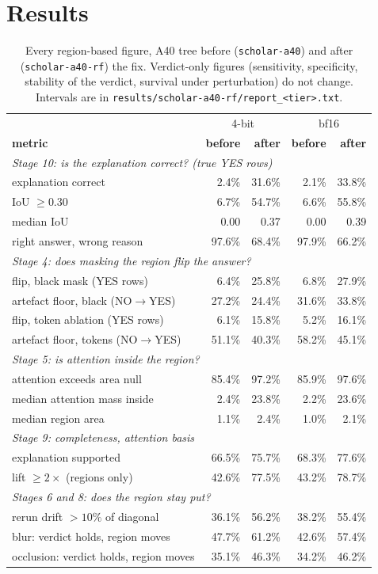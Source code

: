 \section{Results}

\begin{table}[tbp]
\centering
\small
\begin{tabular}{p{6.0cm}rrrr}
\toprule
 & \multicolumn{2}{c}{4-bit} & \multicolumn{2}{c}{bf16} \\
\textbf{metric} & \textbf{before} & \textbf{after} & \textbf{before} & \textbf{after} \\
\midrule
\multicolumn{5}{l}{\emph{Stage 10: is the explanation correct? (true YES rows)}} \\
explanation correct & 2.4\% & 31.6\% & 2.1\% & 33.8\% \\
IoU $\geq 0.30$ & 6.7\% & 54.7\% & 6.6\% & 55.8\% \\
median IoU & 0.00 & 0.37 & 0.00 & 0.39 \\
right answer, wrong reason & 97.6\% & 68.4\% & 97.9\% & 66.2\% \\
\multicolumn{5}{l}{\emph{Stage 4: does masking the region flip the answer?}} \\
flip, black mask (YES rows) & 6.4\% & 25.8\% & 6.8\% & 27.9\% \\
artefact floor, black (NO$\to$YES) & 27.2\% & 24.4\% & 31.6\% & 33.8\% \\
flip, token ablation (YES rows) & 6.1\% & 15.8\% & 5.2\% & 16.1\% \\
artefact floor, tokens (NO$\to$YES) & 51.1\% & 40.3\% & 58.2\% & 45.1\% \\
\multicolumn{5}{l}{\emph{Stage 5: is attention inside the region?}} \\
attention exceeds area null & 85.4\% & 97.2\% & 85.9\% & 97.6\% \\
median attention mass inside & 2.4\% & 23.8\% & 2.2\% & 23.6\% \\
median region area & 1.1\% & 2.4\% & 1.0\% & 2.1\% \\
\multicolumn{5}{l}{\emph{Stage 9: completeness, attention basis}} \\
explanation supported & 66.5\% & 75.7\% & 68.3\% & 77.6\% \\
lift $\geq 2\times$ (regions only) & 42.6\% & 77.5\% & 43.2\% & 78.7\% \\
\multicolumn{5}{l}{\emph{Stages 6 and 8: does the region stay put?}} \\
rerun drift $>10\%$ of diagonal & 36.1\% & 56.2\% & 38.2\% & 55.4\% \\
blur: verdict holds, region moves & 47.7\% & 61.2\% & 42.6\% & 57.4\% \\
occlusion: verdict holds, region moves & 35.1\% & 46.3\% & 34.2\% & 46.2\% \\
\bottomrule
\end{tabular}
\caption{Every region-based figure, A40 tree before (\texttt{scholar-a40}) and after
(\texttt{scholar-a40-rf}) the fix. Verdict-only figures (sensitivity, specificity, stability of the
verdict, survival under perturbation) do not change. Intervals are in
\texttt{results/scholar-a40-rf/report\_<tier>.txt}.}
\label{tab:s28}
\end{table}

